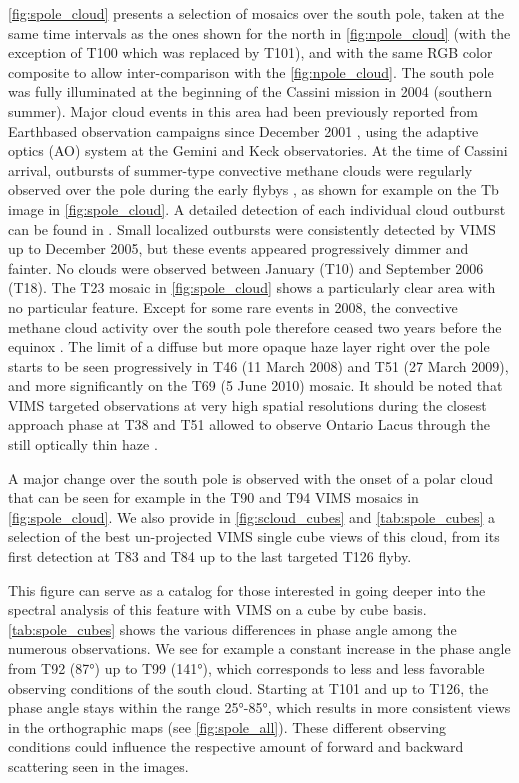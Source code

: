\documentclass[preprint,twocolumn,5p,authoryear,compress,colorlinks=true]{elsarticle}
\newcommand{\figref}[1]{\autoref{fig:#1}}
\newcommand{\tabref}[1]{\autoref{tab:#1}}
\begin{document}
\figref{spole_cloud} presents a selection of mosaics over the south pole, taken at the same time intervals as the ones shown for the north in \figref{npole_cloud} (with the exception of T100 which was replaced by T101), and with the same RGB color composite to allow inter-comparison with the \figref{npole_cloud}.
The south pole was fully illuminated at the beginning of the Cassini mission in 2004 (southern summer). Major cloud events in this area had been previously reported from Earthbased observation campaigns since December 2001 \citep{Brown2002,Roe2002,Schaller2006a}, using the adaptive optics (AO) system at the Gemini and Keck observatories.
At the time of Cassini arrival, outbursts of summer-type convective methane clouds were regularly observed over the pole during the early flybys \citep{Rodriguez2009,Rodriguez2011,Turtle2009,Turtle2011}, as shown for example on the Tb image in \figref{spole_cloud}.
A detailed detection of each individual cloud outburst can be found in \cite{Rodriguez2009, Rodriguez2011}. Small localized outbursts were consistently detected by VIMS up to December 2005, but these events appeared progressively dimmer and fainter. No clouds were observed between January (T10) and September 2006 (T18). The T23 mosaic in \figref{spole_cloud} shows a particularly clear area with no particular feature. Except for some rare events in 2008, the convective methane cloud activity over the south pole therefore ceased two years before the equinox \citep{Rodriguez2011,Turtle2009,Turtle2011}.
The limit of a diffuse but more opaque haze layer right over the pole starts to be seen progressively in T46 (11 March 2008) and T51 (27 March 2009), and more significantly on the T69 (5 June 2010) mosaic. It should be noted that VIMS targeted observations at very high spatial resolutions during the closest approach phase at T38 and T51 allowed to observe Ontario Lacus through the still optically thin haze \citep{Barnes2009,Cornet2012a,Cornet2012b}.

A major change over the south pole is observed with the onset of a polar cloud that can be seen for example in the T90 and T94 VIMS mosaics in \figref{spole_cloud}. We also provide in \figref{scloud_cubes} and \tabref{spole_cubes} a selection of the best un-projected VIMS single cube views of this cloud, from its first detection at T83 and T84 \citep[the two flybys used in][]{deKok2014} up to the last targeted T126 flyby.

This figure can serve as a catalog for those interested in going deeper into the spectral analysis of this feature with VIMS on a cube by cube basis. \tabref{spole_cubes} shows the various differences in phase angle among the numerous observations. We see for example a constant increase in the phase angle from T92 (\ang{87}) up to T99 (\ang{141}), which corresponds to less and less favorable observing conditions of the south cloud. Starting at T101 and up to T126, the phase angle stays within the range \ang{25}-\ang{85}, which results in more consistent views in the orthographic maps (see \figref{spole_all}). These different observing conditions could influence the respective amount of forward and backward scattering seen in the images.
\end{document}
